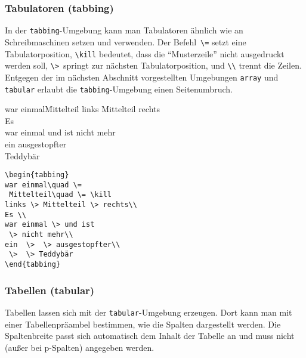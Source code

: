  
\subsubsection{Tabulatoren (tabbing)} \label{tabbing}
 
In der \texttt{tabbing}-Umgebung kann man Tabulatoren ähnlich wie
an Schreibmaschinen setzen und verwenden.
Der Befehl~\lstinline|\=| setzt eine Tabulatorposition,
\lstinline|\kill| bedeutet, dass die "`Musterzeile"' nicht ausgedruckt werden
soll,
\lstinline|\>|~springt zur nächsten Tabulatorposition,
und \lstinline|\\| trennt die Zeilen. Entgegen der im nächsten Abschnitt 
vorgestellten Umgebungen \texttt{array} und \texttt{tabular} erlaubt
die \texttt{tabbing}-Umgebung einen Seitenumbruch.

%
\exa
\begin{tabbing}
war einmal\quad \=
 Mittelteil\quad \= \kill
links \> Mittelteil \> rechts\\
Es \\
war einmal \> und ist
 \> nicht mehr\\
ein  \>  \> ausgestopfter\\
 \>  \> Teddybär
\end{tabbing}
\exb
\begin{verbatim}
\begin{tabbing}
war einmal\quad \=
 Mittelteil\quad \= \kill
links \> Mittelteil \> rechts\\
Es \\
war einmal \> und ist
 \> nicht mehr\\
ein  \>  \> ausgestopfter\\
 \>  \> Teddybär
\end{tabbing}
\end{verbatim}
\exc


\subsubsection{Tabellen (tabular)} \label{tabular}
 
Tabellen lassen sich mit der \texttt{tabular}-Umgebung erzeugen. Dort kann man mit einer Tabellenpräambel bestimmen, wie die Spalten dargestellt werden. Die Spaltenbreite passt sich automatisch dem Inhalt der Tabelle an und muss nicht (außer bei p-Spalten) angegeben werden.

 
